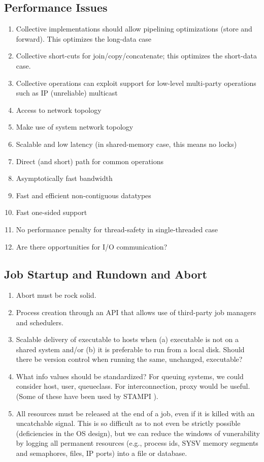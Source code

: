 \documentclass{article}
\begin{document}
\subsection{Performance Issues}
\begin{enumerate}
\item Collective implementations should allow pipelining optimizations (store
  and forward).  This optimizes the long-data case
\item Collective short-cuts for join/copy/concatenate; this optimizes the
  short-data case.
\item Collective operations can exploit support for low-level multi-party
  operations such as IP (unreliable) multicast
\item Access to network topology
\item Make use of system network topology
\item Scalable and low latency (in shared-memory case, this means no locks)
\item Direct (and short) path for common operations
\item Asymptotically fast bandwidth
\item Fast and efficient non-contiguous datatypes
\item Fast one-sided support
\item No performance penalty for thread-safety in single-threaded case
\item Are there opportunities for I/O communication?
\end{enumerate}

\subsection{Job Startup and Rundown and Abort}
\begin{enumerate}
\item Abort must be rock solid.
\item Process creation through an API that allows use of third-party job
  managers and schedulers.
\item Scalable delivery of executable to hosts when (a) executable is not on a
  shared system and/or (b) it is preferable to run from a local disk.  Should
  there be version   control when running the same, unchanged, executable?
\item What info values should be standardized?  For queuing systems, we could
  consider host, user, queueclass.  For interconnection, proxy would be
  useful.  (Some of these have been used by STAMPI \cite{stampi}).
\item All resources must be released at the end of a job, even if it is killed
  with an uncatchable signal.  This is so difficult as to not even be strictly
  possible (deficiencies in the OS design), but we can reduce the windows of
  vunerability by logging all permanent resources (e.g., process ids, SYSV
  memory segments and semaphores, files, IP ports) into a file or database.
\end{enumerate}
\end{document}
